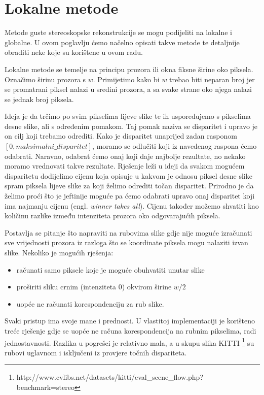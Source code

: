 \documentclass[utf8, zavrsni, numeric]{fer}
\begin{document}
\chapter{Lokalne metode}
Metode guste stereoskopske rekonstrukcije se mogu podijeliti na lokalne i globalne. U ovom poglavlju ćemo načelno opisati takve metode te detaljnije obraditi neke koje su korištene u ovom radu.

Lokalne metode se temelje na principu prozora ili okna fiksne širine oko piksela. Označimo širinu prozora s $w$. Primijetimo kako bi $w$ trebao biti neparan broj jer se promatrani piksel
nalazi u sredini prozora, a sa svake strane oko njega nalazi se jednak broj piksela.

Ideja je da trčimo po svim pikselima lijeve slike te ih uspoređujemo s pikselima desne slike, ali
s određenim pomakom. Taj pomak naziva se disparitet i upravo je on cilj koji trebamo odrediti.
Kako je disparitet unaprijed zadan rasponom $[0, maksimalni\_disparitet]$, moramo se odlučiti
koji iz navedenog raspona ćemo odabrati. Naravno, odabrat ćemo onaj koji daje najbolje rezultate, no nekako moramo vrednovati takve rezultate. Rješenje leži u ideji da svakom mogućem
disparitetu dodijelimo cijenu koja opisuje u kakvom je odnosu piksel desne slike spram piksela
lijeve slike za koji želimo odrediti točan disparitet. Prirodno je da želimo proći što je
jeftinije moguće pa ćemo odabrati upravo onaj disparitet koji ima najmanju cijenu (engl. {\sl winner takes all}). Cijenu
također možemo shvatiti kao količinu razlike između intenziteta prozora oko odgovarajućih piksela.

Postavlja se pitanje što napraviti na rubovima slike gdje nije moguće izračunati sve vrijednosti prozora iz razloga što se koordinate piksela mogu nalaziti izvan slike. Nekoliko je mogućih rješenja:
\begin{itemize}
  \item računati samo piksele koje je moguće obuhvatiti unutar slike
  \item proširiti sliku crnim (intenziteta 0) okvirom širine $w/2$
  \item uopće ne računati korespondenciju za rub slike.
\end{itemize}

Svaki pristup ima svoje mane i prednosti. U vlastitoj implementaciji je korišteno treće rješenje gdje se uopće ne računa korespondencija na rubnim pikselima, radi jednostavnosti. Razlika u pogrešci je relativno
mala, a u skupu slika KITTI \footnote{http://www.cvlibs.net/datasets/kitti/eval\_scene\_flow.php?benchmark=stereo} su rubovi uglavnom i isključeni iz provjere točnih dispariteta.
\end{document}

